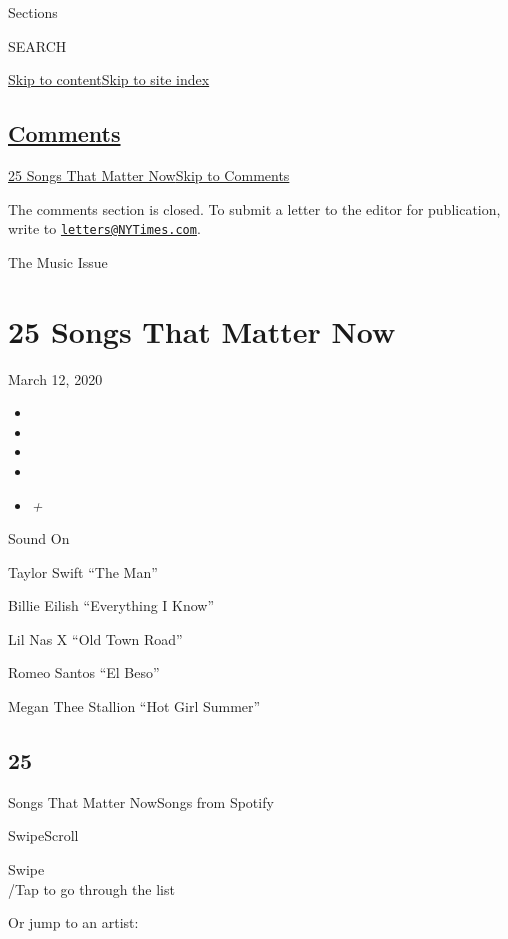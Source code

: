 Sections

SEARCH

\protect\hyperlink{site-content}{Skip to
content}\protect\hyperlink{site-index}{Skip to site index}

\hypertarget{comments}{%
\subsection{\texorpdfstring{\protect\hyperlink{commentsContainer}{Comments}}{Comments}}\label{comments}}

\href{}{25 Songs That Matter Now}\href{}{Skip to Comments}

The comments section is closed. To submit a letter to the editor for
publication, write to
\href{mailto:letters@NYTimes.com}{\nolinkurl{letters@NYTimes.com}}.

The Music Issue

\hypertarget{25-songs-that-matter-now}{%
\section{25 Songs That Matter Now}\label{25-songs-that-matter-now}}

March 12, 2020

\begin{itemize}
\item
\item
\item
\item
\item
  \emph{+}
\end{itemize}

Sound On

Taylor Swift ``The Man''

Billie Eilish ``Everything I Know''

Lil Nas X ``Old Town Road''

Romeo Santos ``El Beso''

Megan Thee Stallion ``Hot Girl Summer''

\hypertarget{25}{%
\subsection{25}\label{25}}

Songs That Matter NowSongs from Spotify

SwipeScroll

Swipe\\
/Tap to go through the list

Or jump to an artist:

